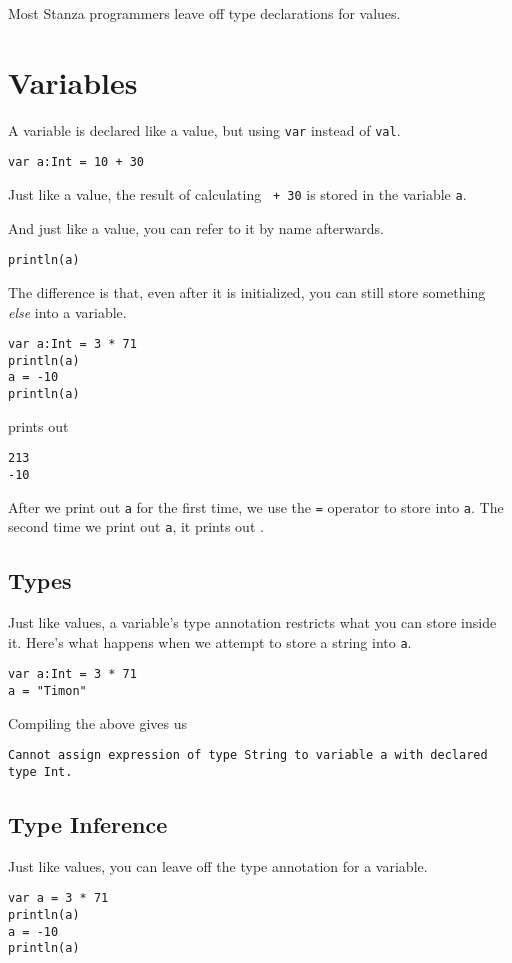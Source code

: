 \documentclass[10pt,oneside]{book}
\begin{document}
Most Stanza programmers leave off type declarations for values.

\section{Variables}

A variable is declared like a value, but using \texttt{\frenchspacing var} instead of \texttt{\frenchspacing val}.
\begin{lstlisting}
var a:Int = 10 + 30
\end{lstlisting}

Just like a value, the result of calculating \texttt{ + 30} is stored in the variable \texttt{\frenchspacing a}. 

And just like a value, you can refer to it by name afterwards.
\begin{lstlisting}
println(a)
\end{lstlisting}

The difference is that, even after it is initialized, you can still store something {\em else} into a variable. 
\begin{lstlisting}
var a:Int = 3 * 71
println(a)
a = -10
println(a)
\end{lstlisting}
prints out
\begin{lstlisting}
213
-10
\end{lstlisting}

After we print out \texttt{\frenchspacing a} for the first time, we use the \texttt{\frenchspacing =} operator to store \texttt{} into \texttt{\frenchspacing a}. The second time we print out \texttt{\frenchspacing a}, it prints out \texttt{}.

\subsection*{Types}
Just like values, a variable's type annotation restricts what you can store inside it. Here's what happens when we attempt to store a string into \texttt{\frenchspacing a}.
\begin{lstlisting}
var a:Int = 3 * 71
a = "Timon"
\end{lstlisting}
Compiling the above gives us
\begin{lstlisting}
Cannot assign expression of type String to variable a with declared type Int.
\end{lstlisting}

\subsection*{Type Inference}
Just like values, you can leave off the type annotation for a variable.
\begin{lstlisting}
var a = 3 * 71
println(a)
a = -10
println(a)
\end{lstlisting}
\end{document}
